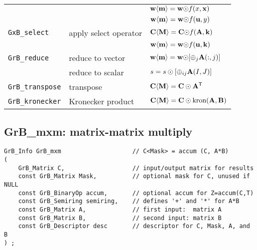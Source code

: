 \documentclass[12pt]{article}
\begin{document}
{\begin{tabular}{lll}
                     &                         & ${\bf w \langle m \rangle = w \odot} f(x,{\bf x})$ \\
                     &                         & ${\bf w \langle m \rangle = w \odot} f({\bf u},y)$ \\
\hline
\verb'GxB_select'    & apply select operator   & ${\bf C \langle M \rangle = C \odot} f{\bf (A,k)}$ \\
                     &                         & ${\bf w \langle m \rangle = w \odot} f{\bf (u,k)}$ \\
\hline
\verb'GrB_reduce'    & reduce to vector        & ${\bf w \langle m \rangle = w \odot} [{\oplus}_j {\bf A}(:,j)]$ \\
                     & reduce to scalar        & $s = s \odot [{\oplus}_{ij}  {\bf A}(I,J)]$ \\
\hline
\verb'GrB_transpose' & transpose               & ${\bf C \langle M \rangle = C \odot A^{\sf T}}$ \\
\hline
\verb'GrB_kronecker' & Kronecker product       & ${\bf C \langle M \rangle = C \odot \mbox{kron}(A, B)}$ \\
\hline
\end{tabular}
}
\vspace{0.2in}

\newpage
\subsection{{\sf GrB\_mxm:} matrix-matrix multiply} %
\label{mxm}

\begin{mdframed}[userdefinedwidth=6in]
{\footnotesize
\begin{verbatim}
GrB_Info GrB_mxm                    // C<Mask> = accum (C, A*B)
(
    GrB_Matrix C,                   // input/output matrix for results
    const GrB_Matrix Mask,          // optional mask for C, unused if NULL
    const GrB_BinaryOp accum,       // optional accum for Z=accum(C,T)
    const GrB_Semiring semiring,    // defines '+' and '*' for A*B
    const GrB_Matrix A,             // first input:  matrix A
    const GrB_Matrix B,             // second input: matrix B
    const GrB_Descriptor desc       // descriptor for C, Mask, A, and B
) ;
\end{verbatim} } \end{mdframed}
\end{document}

